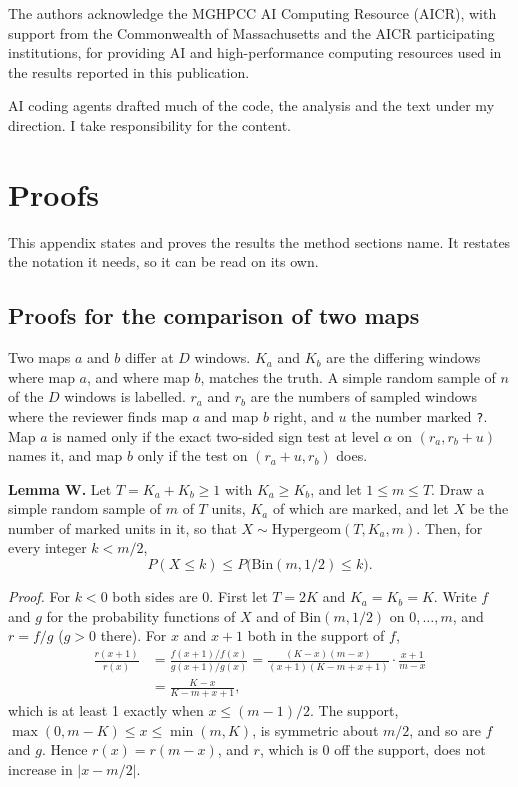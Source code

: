 \documentclass[11pt,a4paper]{article}
\newcommand{\code}[1]{\texttt{#1}}
\begin{document}
The authors acknowledge the MGHPCC AI Computing Resource (AICR), with support from the Commonwealth of Massachusetts
and the AICR participating institutions, for providing AI and high-performance computing resources used in the
results reported in this publication.

AI coding agents drafted much of the code, the analysis and the text under my direction. I take responsibility for
the content.




\appendix
\section{Proofs}
\label{app:proofs}

This appendix states and proves the results the method sections name. It restates the notation it needs, so it can
be read on its own.

\subsection{Proofs for the comparison of two maps}
\label{app:proofs-whichmap}

Two maps $a$ and $b$ differ at $D$ windows. $K_a$ and $K_b$ are the differing windows where map $a$, and where map
$b$, matches the truth. A simple random sample of $n$ of the $D$ windows is labelled. $r_a$ and $r_b$ are the numbers
of sampled windows where the reviewer finds map $a$ and map $b$ right, and $u$ the number marked \code{?}. Map $a$
is named only if the exact two-sided sign test at level $\alpha$ on $(r_a, r_b + u)$ names it, and map $b$ only if
the test on $(r_a + u, r_b)$ does.

\textbf{Lemma W.} Let $T = K_a + K_b \ge 1$ with $K_a \ge K_b$, and let $1 \le m \le T$. Draw a simple random
sample of $m$ of $T$ units, $K_a$ of which are marked, and let $X$ be the number of marked units in it, so that
$X \sim \mathrm{Hypergeom}(T, K_a, m)$. Then, for every integer $k < m/2$,
\begin{equation}
  P(X \le k) \le P\bigl(\mathrm{Bin}(m, 1/2) \le k\bigr).
  \label{eq:proof-lemma-w}
\end{equation}

\textit{Proof.} For $k < 0$ both sides are 0. First let $T = 2K$ and $K_a = K_b = K$. Write $f$ and $g$ for the
probability functions of $X$ and of $\mathrm{Bin}(m, 1/2)$ on $0, \dots, m$, and $r = f/g$ ($g > 0$ there). For $x$
and $x + 1$ both in the support of $f$,
\begin{align*}
  \frac{r(x+1)}{r(x)}
  &= \frac{f(x+1)/f(x)}{g(x+1)/g(x)}
   = \frac{(K - x)(m - x)}{(x + 1)(K - m + x + 1)} \cdot \frac{x + 1}{m - x} \\
  &= \frac{K - x}{K - m + x + 1},
\end{align*}
which is at least 1 exactly when $x \le (m-1)/2$. The support, $\max(0, m - K) \le x \le \min(m, K)$, is symmetric
about $m/2$, and so are $f$ and $g$. Hence $r(x) = r(m - x)$, and $r$, which is 0 off the support, does not increase
in $|x - m/2|$.
\end{document}
